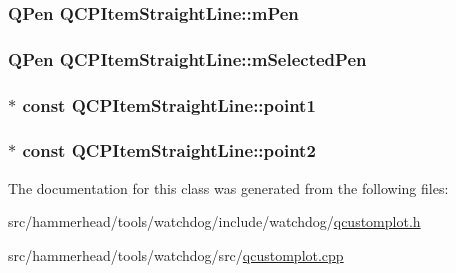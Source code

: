 \subsubsection[{\texorpdfstring{m\+Pen}{mPen}}]{\setlength{\rightskip}{0pt plus 5cm}Q\+Pen Q\+C\+P\+Item\+Straight\+Line\+::m\+Pen\hspace{0.3cm}{\ttfamily [protected]}}\hypertarget{classQCPItemStraightLine_a15106ddc2ebd73ed5c1bc57aa92bee8f}{}\label{classQCPItemStraightLine_a15106ddc2ebd73ed5c1bc57aa92bee8f}
\subsubsection[{\texorpdfstring{m\+Selected\+Pen}{mSelectedPen}}]{\setlength{\rightskip}{0pt plus 5cm}Q\+Pen Q\+C\+P\+Item\+Straight\+Line\+::m\+Selected\+Pen\hspace{0.3cm}{\ttfamily [protected]}}\hypertarget{classQCPItemStraightLine_a0307a0d56a018656adbf798bc84c2a4b}{}\label{classQCPItemStraightLine_a0307a0d56a018656adbf798bc84c2a4b}
\subsubsection[{\texorpdfstring{point1}{point1}}]{$\ast$ const Q\+C\+P\+Item\+Straight\+Line\+::point1}\hypertarget{classQCPItemStraightLine_ac131a6ffe456f2cc7364dce541fe0120}{}\label{classQCPItemStraightLine_ac131a6ffe456f2cc7364dce541fe0120}
\subsubsection[{\texorpdfstring{point2}{point2}}]{$\ast$ const Q\+C\+P\+Item\+Straight\+Line\+::point2}\hypertarget{classQCPItemStraightLine_ad26c0a732e471f63f75d481dcd48cfc9}{}\label{classQCPItemStraightLine_ad26c0a732e471f63f75d481dcd48cfc9}


The documentation for this class was generated from the following files\+:\begin{DoxyCompactItemize}
\item 
src/hammerhead/tools/watchdog/include/watchdog/\hyperlink{qcustomplot_8h}{qcustomplot.\+h}\item 
src/hammerhead/tools/watchdog/src/\hyperlink{qcustomplot_8cpp}{qcustomplot.\+cpp}\end{DoxyCompactItemize}
